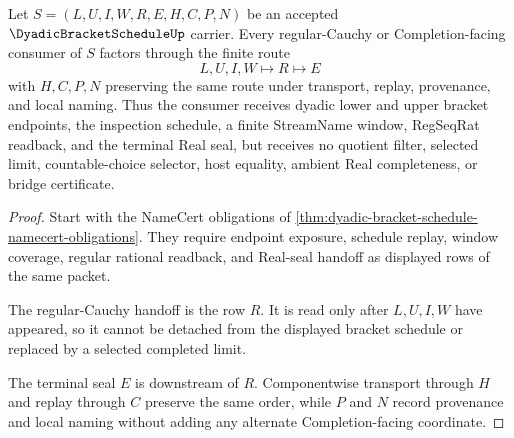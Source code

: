 \begin{theorem}
\label{thm:dyadic-bracket-schedule-regular-cauchy-handoff}
Let $S=(L,U,I,W,R,E,H,C,P,N)$ be an accepted $\DyadicBracketScheduleUp$ carrier. Every regular-Cauchy or Completion-facing consumer of $S$ factors through the finite route
$$
L,U,I,W \longmapsto R \longmapsto E
$$
with $H,C,P,N$ preserving the same route under transport, replay, provenance, and local naming. Thus the consumer receives dyadic lower and upper bracket endpoints, the inspection schedule, a finite StreamName window, RegSeqRat readback, and the terminal Real seal, but receives no quotient filter, selected limit, countable-choice selector, host equality, ambient Real completeness, or bridge certificate.
\end{theorem}
\begin{proof}
Start with the NameCert obligations of \autoref{thm:dyadic-bracket-schedule-namecert-obligations}. They require endpoint exposure, schedule replay, window coverage, regular rational readback, and Real-seal handoff as displayed rows of the same packet.

The regular-Cauchy handoff is the row $R$. It is read only after $L,U,I,W$ have appeared, so it cannot be detached from the displayed bracket schedule or replaced by a selected completed limit.

The terminal seal $E$ is downstream of $R$. Componentwise transport through $H$ and replay through $C$ preserve the same order, while $P$ and $N$ record provenance and local naming without adding any alternate Completion-facing coordinate.
\end{proof}

